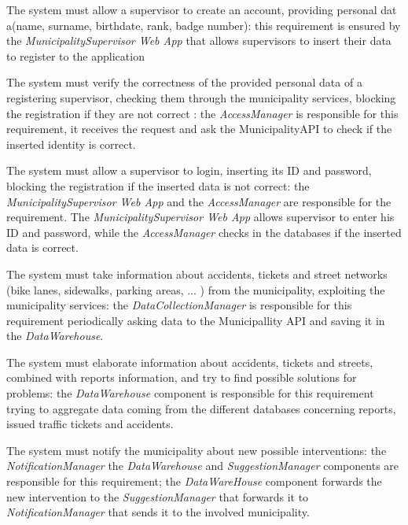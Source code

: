 \documentclass[a4paper]{report}
\begin{document}
\begin{enumerate}[start=1,label={[R\arabic*]}]
\item \label{[R38]}The system must allow a supervisor to create an account, providing personal dat a(name, surname, birthdate, rank, badge number): this requirement is ensured by  the\textit{ MunicipalitySupervisor Web App} that allows supervisors to insert their data to register to the application
\item \label{[R39]}The system must verify the correctness of the provided personal data of a registering supervisor, checking them through the municipality services, blocking the registration if they are not correct : the \textit{AccessManager} is responsible for this requirement, it receives the request and ask the MunicipalityAPI to check if the inserted identity is correct.
\item \label{[R40]}The system must allow a supervisor to login, inserting its ID and password, blocking the registration if the inserted data is not correct: the \textit{MunicipalitySupervisor Web App} and the \textit{AccessManager} are responsible for the requirement. The \textit{MunicipalitySupervisor Web App} allows supervisor to enter his ID and password, while the \textit{AccessManager} checks in the databases if the inserted data is correct.
\item \label{[R41]}The system must take information about accidents, tickets and street networks (bike lanes, sidewalks, parking areas, ... ) from the municipality, exploiting the municipality services: the\textit{ DataCollectionManager} is responsible for this requirement periodically asking data to the Municipallity API and saving it in the \textit{DataWarehouse}.
\item \label{[R42]}The system must elaborate information about accidents, tickets and streets, combined with reports information, and try to find possible solutions for problems: the \textit{DataWarehouse} component is responsible for this requirement trying to aggregate data coming from the different databases concerning reports, issued traffic tickets and accidents.
\item \label{[R43]}The system must notify the municipality about new possible interventions: the \textit{NotificationManager} the \textit{DataWarehouse} and \textit{SuggestionManager} components are responsible for this requirement; the \textit{DataWareHouse} component forwards the new intervention to the \textit{SuggestionManager} that forwards it to \textit{NotificationManager} that sends it to  the involved municipality.

\end{enumerate}
\end{document}
